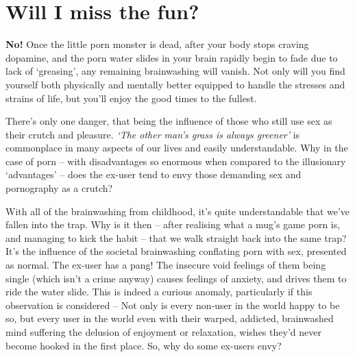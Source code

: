 \documentclass[
]{book}
\begin{document}
\hypertarget{will-i-miss-the-fun}{%
\chapter{Will I miss the fun?}\label{will-i-miss-the-fun}}

\textbf{No!} Once the little porn monster is dead, after your body stops craving dopamine, and the porn water slides in your brain rapidly begin to fade due to lack of `greasing', any remaining brainwashing will vanish. Not only will you find yourself both physically and mentally better equipped to handle the stresses and strains of life, but you'll enjoy the good times to the fullest.

There's only one danger, that being the influence of those who still use sex as their crutch and pleasure. \emph{`The other man's grass is always greener'} is commonplace in many aspects of our lives and easily understandable. Why in the case of porn -- with disadvantages so enormous when compared to the illusionary `advantages' -- does the ex-user tend to envy those demanding sex and pornography as a crutch?

With all of the brainwashing from childhood, it's quite understandable that we've fallen into the trap. Why is it then -- after realising what a mug's game porn is, and managing to kick the habit -- that we walk straight back into the same trap? It's the influence of the societal brainwashing conflating porn with sex, presented as normal. The ex-user has a pang! The insecure void feelings of them being single (which isn't a crime anyway) causes feelings of anxiety, and drives them to ride the water slide. This is indeed a curious anomaly, particularly if this observation is considered -- Not only is every non-user in the world happy to be so, but every user in the world even with their warped, addicted, brainwashed mind suffering the delusion of enjoyment or relaxation, wishes they'd never become hooked in the first place. So, why do some ex-users envy?
\end{document}
